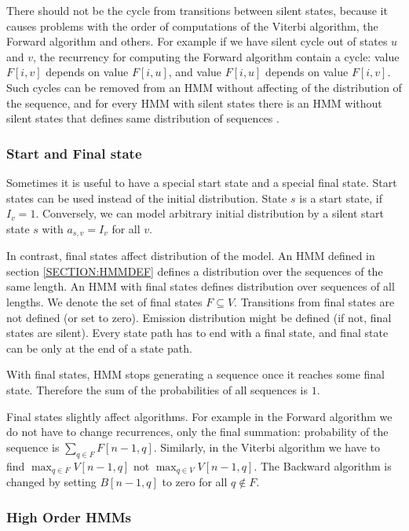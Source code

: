 There should not be the cycle from transitions between silent states, because
it causes problems with the order of computations of the Viterbi algorithm, the
Forward algorithm and others. For example if we have silent cycle out of states
$u$ and $v$, the recurrency for computing the Forward algorithm contain a
cycle: value $F[i, v]$ depends on value $F[i, u]$, and value $F[i,u]$ depends
on value $F[i, v]$.  Such cycles can be removed from an HMM without affecting
of the distribution of the sequence, and for every HMM with silent
states there is an HMM without silent states that defines same distribution of
sequences \cite{Nanasi2010mgr}.


\subsubsection{Start and Final state}

Sometimes it is useful to have a special start state and a special final state.
Start states can be used instead of the initial distribution. State $s$ is a start
state, if $I_v=1$. Conversely, we can model arbitrary initial distribution by a silent start state $s$
with $a_{s,v}=I_v$ for all $v$.

In contrast, final states affect distribution of the model. An HMM defined in section
\ref{SECTION:HMMDEF} defines a distribution over the sequences of the same length.
An HMM with
final states defines distribution over sequences of all lengths.  We denote the
set of final states $F\subseteq V$. Transitions from final states are not
defined (or set to zero). Emission distribution might be defined (if not, final
states are silent). Every state path has to end with a final state, and
final state can be only at the end of a state path.

With final states, HMM stops generating a sequence once it reaches some final
state. Therefore the sum of the probabilities of all sequences is $1$.

Final states slightly affect algorithms. For example in the Forward algorithm
we do not have to change recurrences, only the final summation: probability of
the sequence is $\sum_{q\in F}F[n-1,q]$.  Similarly, in the Viterbi algorithm
we have to find $\max_{q\in F} V[n-1,q]$ not $\max_{q\in V} V[n-1,q]$.  The
Backward algorithm is changed by setting $B[n-1,q]$ to zero for all $q\notin
F$.

\subsubsection{High Order HMMs}

